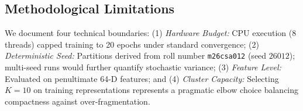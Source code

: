 \subsection{Methodological Limitations}
We document four technical boundaries: (1) \textit{Hardware Budget:} CPU execution (8 threads) capped training to 20 epochs under standard convergence; (2) \textit{Deterministic Seed:} Partitions derived from roll number \texttt{m26csa012} (seed $26012$); multi-seed runs would further quantify stochastic variance; (3) \textit{Feature Level:} Evaluated on penultimate 64-D features; and (4) \textit{Cluster Capacity:} Selecting $K=10$ on training representations represents a pragmatic elbow choice balancing compactness against over-fragmentation.

